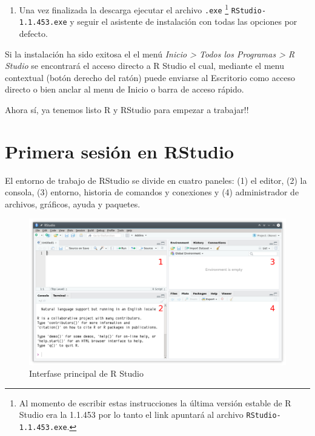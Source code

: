 \documentclass[a4paper]{book}
\providecommand{\tightlist}{%
  \setlength{\itemsep}{0pt}\setlength{\parskip}{0pt}}
\let\rmarkdownfootnote\footnote%
\def\footnote{\protect\rmarkdownfootnote}
\begin{document}
\begin{enumerate}
\def\labelenumi{\arabic{enumi})}
\setcounter{enumi}{2}
\tightlist
\item
  Una vez finalizada la descarga ejecutar el archivo \texttt{.exe}
  \footnote{Al momento de escribir estas instrucciones la última versión
    estable de R Studio era la 1.1.453 por lo tanto el link apuntará al
    archivo \texttt{RStudio-1.1.453.exe}.} \texttt{RStudio-1.1.453.exe}
  y seguir el asistente de instalación con todas las opciones por
  defecto.
\end{enumerate}

Si la instalación ha sido exitosa el el menú \emph{Inicio \textgreater{}
Todos los Programas \textgreater{} R Studio} se encontrará el acceso
directo a R Studio el cual, mediante el menu contextual (botón derecho
del ratón) puede enviarse al Escritorio como acceso directo o bien
anclar al menu de Inicio o barra de acceso rápido.

Ahora sí, ya tenemos listo R y RStudio para empezar a trabajar!!

\hypertarget{primera-sesion-en-rstudio}{%
\section{Primera sesión en RStudio}\label{primera-sesion-en-rstudio}}

El entorno de trabajo de RStudio se divide en cuatro paneles: (1) el
editor, (2) la consola, (3) entorno, historia de comandos y conexiones y
(4) administrador de archivos, gráficos, ayuda y paquetes.

\begin{figure}[h]

{\centering \includegraphics[width=0.75\linewidth,]{images/RStudio_paneles} 

}

\caption{Interfase principal de R Studio}\label{fig:unnamed-chunk-10}
\end{figure}
\end{document}
